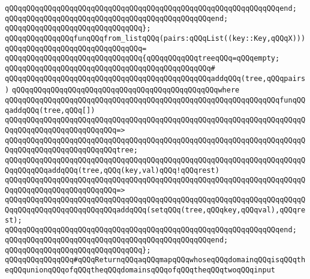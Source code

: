 \verb|qQQqqQQqqQQqqQQqqQQqqQQqqQQqqQQqqQQqqQQqqQQqqQQqqQQqqQQqqQQqqQQqend;|\newline
\verb|qQQqqQQqqQQqqQQqqQQqqQQqqQQqqQQqqQQqqQQqqQQqqQQqend;|\newline
\verb|qQQqqQQqqQQqqQQqqQQqqQQqqQQqqQQq};|\newline
\newline
\verb|qQQqqQQqqQQqqQQqfunqQQqfrom_listqQQq(pairs:qQQqList((key::Key,qQQqX)))|\newline
\verb|qQQqqQQqqQQqqQQqqQQqqQQqqQQqqQQq=|\newline
\verb|qQQqqQQqqQQqqQQqqQQqqQQqqQQqqQQq{qQQqqQQqqQQqtreeqQQq=qQQqempty;|\newline
\verb|qQQqqQQqqQQqqQQqqQQqqQQqqQQqqQQqqQQqqQQqqQQqqQQq#|\newline
\verb|qQQqqQQqqQQqqQQqqQQqqQQqqQQqqQQqqQQqqQQqqQQqqQQqaddqQQq(tree,qQQqpairs)|\newline
\verb|qQQqqQQqqQQqqQQqqQQqqQQqqQQqqQQqqQQqqQQqqQQqqQQqwhere|\newline
\verb|qQQqqQQqqQQqqQQqqQQqqQQqqQQqqQQqqQQqqQQqqQQqqQQqqQQqqQQqqQQqqQQqfunqQQqaddqQQq(tree,qQQq[])|\newline
\verb|qQQqqQQqqQQqqQQqqQQqqQQqqQQqqQQqqQQqqQQqqQQqqQQqqQQqqQQqqQQqqQQqqQQqqQQqqQQqqQQqqQQqqQQqqQQqqQQq=>|\newline
\verb|qQQqqQQqqQQqqQQqqQQqqQQqqQQqqQQqqQQqqQQqqQQqqQQqqQQqqQQqqQQqqQQqqQQqqQQqqQQqqQQqqQQqqQQqqQQqqQQqtree;|\newline
\newline
\verb|qQQqqQQqqQQqqQQqqQQqqQQqqQQqqQQqqQQqqQQqqQQqqQQqqQQqqQQqqQQqqQQqqQQqqQQqqQQqqQQqaddqQQq(tree,qQQq(key,val)qQQq!qQQqrest)|\newline
\verb|qQQqqQQqqQQqqQQqqQQqqQQqqQQqqQQqqQQqqQQqqQQqqQQqqQQqqQQqqQQqqQQqqQQqqQQqqQQqqQQqqQQqqQQqqQQqqQQq=>|\newline
\verb|qQQqqQQqqQQqqQQqqQQqqQQqqQQqqQQqqQQqqQQqqQQqqQQqqQQqqQQqqQQqqQQqqQQqqQQqqQQqqQQqqQQqqQQqqQQqqQQqaddqQQq(setqQQq(tree,qQQqkey,qQQqval),qQQqrest);|\newline
\verb|qQQqqQQqqQQqqQQqqQQqqQQqqQQqqQQqqQQqqQQqqQQqqQQqqQQqqQQqqQQqqQQqend;|\newline
\verb|qQQqqQQqqQQqqQQqqQQqqQQqqQQqqQQqqQQqqQQqqQQqqQQqend;|\newline
\verb|qQQqqQQqqQQqqQQqqQQqqQQqqQQqqQQq};|\newline
\newline
\verb|qQQqqQQqqQQqqQQq#qQQqReturnqQQqaqQQqmapqQQqwhoseqQQqdomainqQQqisqQQqtheqQQqunionqQQqofqQQqtheqQQqdomainsqQQqofqQQqtheqQQqtwoqQQqinput|\newline
